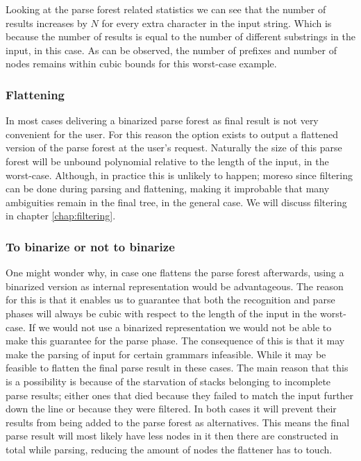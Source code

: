 \documentclass[a4paper,10pt]{article}
\begin{document}
Looking at the parse forest related statistics we can see that the number of results increases by $N$ for every extra character in the input string. Which is because the number of results is equal to the number of different substrings in the input, in this case. As can be observed, the number of prefixes and number of nodes remains within cubic bounds for this worst-case example.

\subsubsection{Flattening}
In most cases delivering a binarized parse forest as final result is not very convenient for the user. For this reason the option exists to output a flattened version of the parse forest at the user's request. Naturally the size of this parse forest will be unbound polynomial relative to the length of the input, in the worst-case. Although, in practice this is unlikely to happen; moreso since filtering can be done during parsing and flattening, making it improbable that many ambiguities remain in the final tree, in the general case. We will discuss filtering in chapter \ref{chap:filtering}.

\subsubsection{To binarize or not to binarize}
\label{subsec:Binarization}
One might wonder why, in case one flattens the parse forest afterwards, using a binarized version as internal representation would be advantageous. The reason for this is that it enables us to guarantee that both the recognition and parse phases will always be cubic with respect to the length of the input in the worst-case. If we would not use a binarized representation we would not be able to make this guarantee for the parse phase. The consequence of this is that it may make the parsing of input for certain grammars infeasible. While it may be feasible to flatten the final parse result in these cases. The main reason that this is a possibility is because of the starvation of stacks belonging to incomplete parse results; either ones that died because they failed to match the input further down the line or because they were filtered. In both cases it will prevent their results from being added to the parse forest as alternatives. This means the final parse result will most likely have less nodes in it then there are constructed in total while parsing, reducing the amount of nodes the flattener has to touch.
\end{document}
